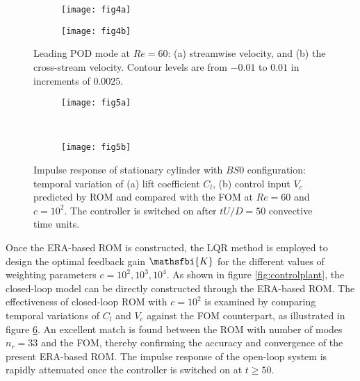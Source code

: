 \documentclass[standard]{jfm}
\begin{document}
\begin{figure}
\centering
\begin{subfigure}[c]{0.495\textwidth} 
\centering
  \texttt{[image: fig4a]}
	\caption{}
	\label{fig:mode1ux}
	\end{subfigure}	
\begin{subfigure}[c]{0.495\textwidth} 
\centering
  \texttt{[image: fig4b]}
	\caption{}
	\label{fig:mode1uy}
	\end{subfigure}		
        \caption{Leading POD mode at $Re=60$:  
        (a) streamwise velocity, and (b) the cross-stream velocity. 
        Contour levels are from $-0.01$ to $0.01$ in increments of $0.0025$.}
        \label{fig:modes}
\end{figure}
%

\begin{figure}
\centering
\begin{subfigure}[b]{\columnwidth}
\centering
 \texttt{[image: fig5a]}
    \caption{}
    \label{fig:val_cl}
    \end{subfigure} \\
\begin{subfigure}[b]{\columnwidth} 
\centering
  \texttt{[image: fig5b]}
	\caption{}
	\label{fig:val_uc}
	\end{subfigure}	
        \caption{Impulse response of stationary cylinder with $BS0$ configuration: temporal variation of
        (a) lift coefficient $C_l$, 
        (b) control input $V_c$ predicted by ROM and 
        compared with the FOM at $Re=60$ and $c=10^2$.
         The controller is switched on after $tU/D=50$ convective time units.  }
        \label{fig:linear_val}
\end{figure}

Once the ERA-based ROM is constructed, the LQR method is employed to design the optimal feedback gain $\mathsfbi{K}$ 
for the different values of weighting parameters $c=10^2, 10^3, 10^4$. 
As shown in figure \ref{fig:controlplant}, the closed-loop model 
can be directly constructed through the ERA-based ROM. 
The effectiveness of closed-loop ROM with $c=10^2$ is examined  
by comparing temporal variations of $C_l$ and $V_c$ against the FOM counterpart, 
as illustrated in figure \ref{fig:linear_val}. 
An excellent match is found between the ROM with number of modes $n_r = 33$ and 
the FOM, thereby confirming the accuracy and convergence of 
the present ERA-based ROM. The impulse response of the open-loop system is rapidly attenuated 
once the controller is switched on at $t \geqslant 50$. 
\end{document}
